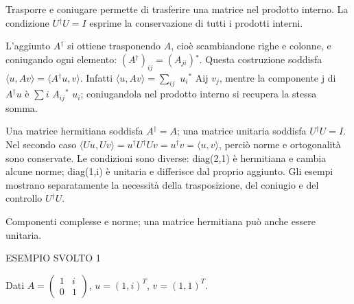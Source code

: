 Trasporre e coniugare permette di trasferire una matrice nel prodotto interno. La condizione \(U{}^{\dagger} U=I\) esprime la conservazione di tutti i prodotti interni.\par

L'aggiunto \(A{}^{\dagger} \) si ottiene trasponendo \(A\), cioè scambiandone righe e colonne, e coniugando ogni elemento: \((A{}^{\dagger} )_{ij}=(A_{ji}){}^{*}\). Questa costruzione soddisfa \(\langle u,\allowbreak Av\rangle =\langle A{}^{\dagger} u,\allowbreak v\rangle \). Infatti \(\langle u,\allowbreak Av\rangle =\sum _{ij}\) \(u_{i}{}^{*}\) Aij \(v_{j}\), mentre la componente j di \(A{}^{\dagger} u\) è \(\sum i\) \(A_{ij}{}^{*}\) \(u_{i}\); coniugandola nel prodotto interno si recupera la stessa somma.\par

Una matrice hermitiana soddisfa \(A{}^{\dagger} =A\); una matrice unitaria soddisfa \(U{}^{\dagger} U=I\). Nel secondo caso \(\langle Uu,\allowbreak Uv\rangle =u{}^{\dagger} U{}^{\dagger} Uv=u{}^{\dagger} v=\langle u,\allowbreak v\rangle \), perciò norme e ortogonalità sono conservate. Le condizioni sono diverse: diag(2,1) è hermitiana e cambia alcune norme; diag(1,i) è unitaria e differisce dal proprio aggiunto. Gli esempi mostrano separatamente la necessità della trasposizione, del coniugio e del controllo \(U{}^{\dagger} U\).\par



Componenti complesse e norme; una matrice hermitiana può anche essere unitaria.\par


\Needspace{.36\textheight}\label{c2-aggiunto-example-1}
{\sffamily\small\color{Accent} ESEMPIO SVOLTO 1\par}
Dati \(A=\)\(\begin{pmatrix}1&i\\0&1\end{pmatrix}\), \(u=(1,\allowbreak i)^{T}\), \(v=(1{,}1)^{T}\).\par


